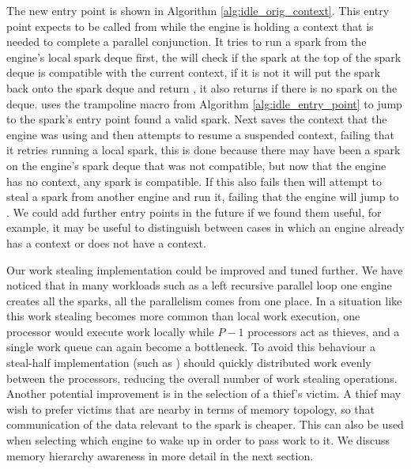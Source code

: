 The new entry point \idleorigcontext is shown in Algorithm
\ref{alg:idle_orig_context}.
This entry point expects to be called from \joinandcontinue while the engine
is holding a context that is needed to complete a parallel conjunction.
It tries to run a spark from the engine's local spark deque first,
the \tryrunlocalspark will check if the spark at the top of the spark deque
is compatible with the current context,
if it is not it will put the spark back onto the spark deque and return
\NULL, it also returns \NULL if there is no spark on the deque.
\idleorigcontext uses the trampoline macro from Algorithm
\ref{alg:idle_entry_point} to jump to the spark's entry point
\tryrunlocalspark found a valid spark.
Next \idleorigcontext saves the context that the engine was using and then
attempts to resume a suspended context,
failing that it retries running a local spark,
this is done because there may have been a spark on the engine's spark deque
that was not compatible, but now that the engine has no context, any spark
is compatible.
If this also fails then
\idleorigcontext will attempt to steal a spark from another engine and run
it,
failing that the engine will jump to \sleep.
We could add further entry points in the future if we found them useful,
for example,
it may be useful to distinguish between cases in which an engine already has a
context or does not have a context.






Our work stealing implementation could be improved and tuned further.
We have noticed that in many workloads such as a left recursive parallel
loop one engine creates all the sparks, all the parallelism comes from one
place.
In a situation like this work stealing becomes more common than local work
execution,
one processor would execute work locally while $P - 1$ processors act as
thieves, and a single work queue can again become a bottleneck.
To avoid this behaviour
a steal-half implementation (such as \citet{hendler:2002:stealhalf})
should quickly distributed work evenly between the processors,
reducing the overall number of work stealing operations.
Another potential improvement is in the selection of a thief's victim.
A thief may wish to prefer victims that are nearby in terms of memory
topology, so that communication of the data relevant to the spark is
cheaper.
This can also be used when selecting which engine to wake up in order to
pass work to it.
We discuss memory hierarchy awareness in more detail in the next section.

